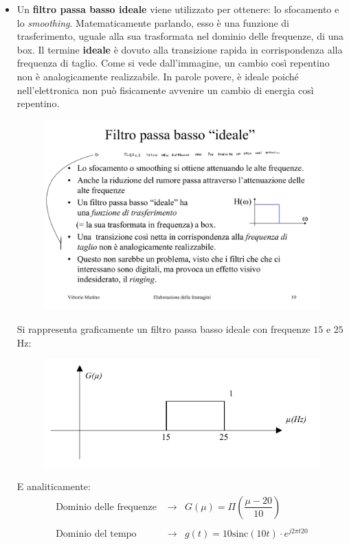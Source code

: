 \documentclass[a4paper]{article}
\begin{document}
\begin{itemize}
		\item Un \textbf{filtro passa basso ideale} viene utilizzato per ottenere: lo sfocamento e lo \emph{smoothing}. Matematicamente parlando, esso è una funzione di trasferimento, uguale alla sua trasformata nel dominio delle frequenze, di una box.\newline
		Il termine \textbf{ideale} è dovuto alla transizione rapida in corrispondenza alla frequenza di taglio. Come si vede dall'immagine, un cambio così repentino non è analogicamente realizzabile.\newline
		In parole povere, è ideale poiché nell'elettronica non può fisicamente avvenire un cambio di energia così repentino.\newline
		\begin{figure}[!htp]
			\centering
			\includegraphics[width=.35\textwidth]{img/box_filtro_passa_bassa_ideale.pdf}
		\end{figure}
			
		\noindent
		Si rappresenta graficamente un filtro passa basso ideale con frequenze $15$ e $25$ Hz:
		\begin{figure}[!htp]
			\centering
			\includegraphics[width=.8\textwidth]{img/filtro_passa_basso_ideale_ex.pdf}
		\end{figure}
		
		\noindent
		E analiticamente:
		\begin{equation*}
			\begin{array}{lll}
				\text{Dominio delle frequenze } & \longrightarrow & G\left(\mu\right) = \Pi\left(\dfrac{\mu - 20}{10}\right) \\
				&& \\
				\text{Dominio del tempo } & \longrightarrow & g\left(t\right) = 10\mathrm{sinc}\left(10t\right) \cdot e^{j 2 \pi t 20}
			\end{array}
		\end{equation*}
	\end{itemize}\newpage
	
\end{document}
